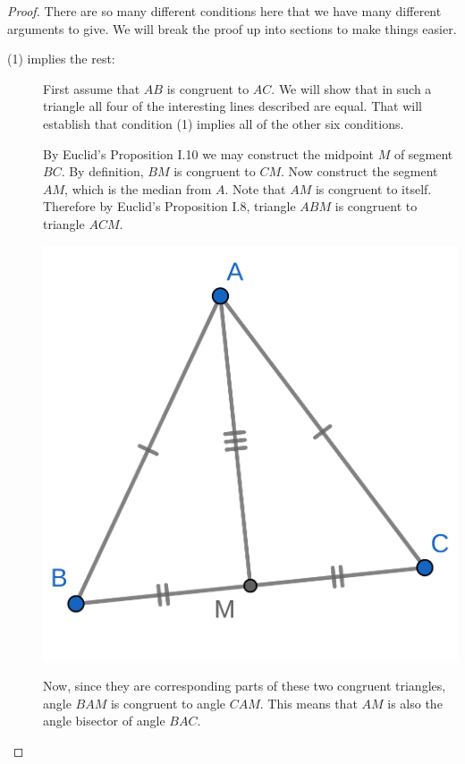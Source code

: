 \documentclass{tufte-handout}
\theoremstyle{definition}
\begin{document}
\begin{proof}
There are so many different conditions here that we have many different arguments to give. We will break the proof up into sections to make things easier.

\begin{description}
\item[(1) implies the rest:]
First assume that $AB$ is congruent to $AC$. We will show that in such a triangle all four of the interesting lines described are equal. That will establish that condition (1) implies all of the other six conditions.



By Euclid's Proposition I.10 we may construct the midpoint $M$ of segment $BC$. By definition, $BM$ is congruent to $CM$. Now construct the segment $AM$, which is the median from $A$. Note that $AM$ is congruent to itself. Therefore by Euclid's Proposition I.8, triangle $ABM$ is congruent to triangle $ACM$.

\begin{marginfigure}
  \includegraphics{images/iso_1.png}
\end{marginfigure}


Now, since they are corresponding parts of these two congruent triangles, angle $BAM$ is congruent to angle $CAM$. This means that $AM$ is also the angle bisector of angle $BAC$.




\end{description}
\end{proof}
\end{document}
